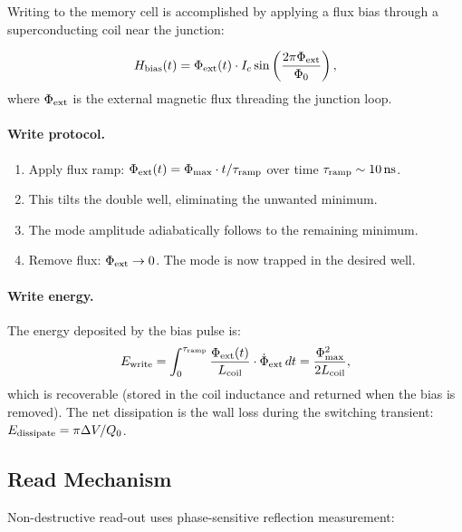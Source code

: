 \documentclass[12pt,a4paper]{article}
\begin{document}
Writing to the memory cell is accomplished by applying a flux bias through a superconducting coil near the junction:

\begin{equation}
H_{\rm bias}(t) = \Phi_{\rm ext}(t) \cdot I_c \sin\left(\frac{2\pi\Phi_{\rm ext}}{\Phi_0}\right),
\end{equation}
where $\Phi_{\rm ext}$ is the external magnetic flux threading the junction loop.

\paragraph{Write protocol.}
\begin{enumerate}
\item Apply flux ramp: $\Phi_{\rm ext}(t) = \Phi_{\rm max} \cdot t / \tau_{\rm ramp}$ over time $\tau_{\rm ramp} \sim 10\,\si{ns}$.
\item This tilts the double well, eliminating the unwanted minimum.
\item The mode amplitude adiabatically follows to the remaining minimum.
\item Remove flux: $\Phi_{\rm ext} \to 0$. The mode is now trapped in the desired well.
\end{enumerate}

\paragraph{Write energy.} The energy deposited by the bias pulse is:
\begin{equation}
E_{\rm write} = \int_0^{\tau_{\rm ramp}} \frac{\Phi_{\rm ext}(t)}{L_{\rm coil}} \cdot \dot{\Phi}_{\rm ext}\,dt = \frac{\Phi_{\rm max}^2}{2L_{\rm coil}},
\end{equation}
which is recoverable (stored in the coil inductance and returned when the bias is removed). The net dissipation is the wall loss during the switching transient: $E_{\rm dissipate} = \pi\Delta V / Q_0$.

\subsection{Read Mechanism}

Non-destructive read-out uses phase-sensitive reflection measurement:
\end{document}
